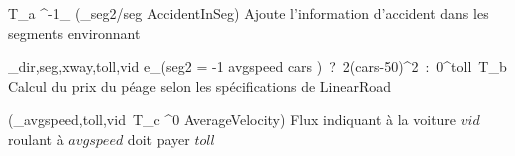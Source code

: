 	{T_a \lojoin^{-1}_{} (\rho_{seg2/seg} AccidentInSeg)}
	{Ajoute l'information d'accident dans les segments environnant}

	{\Pi_{dir,seg,xway,toll,vid} e_{(seg2 = -1 \wedge avgspeed  \wedge cars )\ ?\ 2(cars-50)^2\ :\ 0}^{toll}\ T_b}
	{Calcul du prix du péage selon les spécifications de LinearRoad}

	{\RSu(\Pi_{avgspeed,toll,vid}\ T_c \lojoin^{0} AverageVelocity)}
	{Flux indiquant à la voiture $vid$ roulant à $avgspeed$ doit payer $toll$}